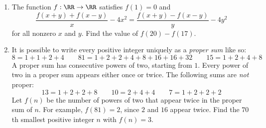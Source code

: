 \documentclass[11pt,paper=letter]{scrartcl}
\begin{document}
\begin{enumerate}[start=4]
  \item The function $f : \RR \to \RR$ satisfies $f(1) = 0$ and $$\frac{f(x+y)+f(x-y)}x - 4x^2 = \frac{f(x+y)-f(x-y)}y - 4y^2$$ for all nonzero $x$ and $y$. Find the value of $f(20) - f(17)$. 

  \item It is possible to write every positive integer uniquely as a \emph{proper sum} like so: $$8 = 1 + 1 + 2 + 4 \qquad 81 = 1 + 2 + 2 + 4 + 8 + 16 + 16 + 32 \qquad 15 = 1 + 2 + 4 + 8$$ A proper sum has consecutive powers of two, starting from $1$. Every power of two in a proper sum appears either once or twice. The following sums are \emph{not} proper: $$13 = 1 + 2 + 2 + 8 \qquad 10 = 2 + 4 + 4 \qquad 7 = 1 + 2 + 2 + 2$$ Let $f(n)$ be the number of powers of two that appear twice in the proper sum of $n$. For example, $f(81) = 2$, since $2$ and $16$ appear twice. Find the $70$th smallest positive integer $n$ with $f(n) = 3$.
\end{enumerate}
\end{document}
